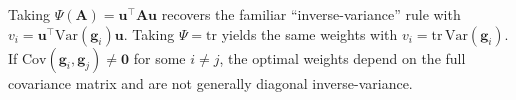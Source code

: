 \begin{remark}
Taking $\Psi(\boldsymbol{A})=\boldsymbol{u}^\top\boldsymbol{A}\boldsymbol{u}$ recovers the familiar “inverse-variance” rule with $v_i=\boldsymbol{u}^\top\mathrm{Var}(\boldsymbol{g}_i)\boldsymbol{u}$. Taking $\Psi=\mathrm{tr}$ yields the same weights with $v_i=\mathrm{tr}\,\mathrm{Var}(\boldsymbol{g}_i)$. If $\mathrm{Cov}(\boldsymbol{g}_i,\boldsymbol{g}_j)\neq \boldsymbol{0}$ for some $i\neq j$, the optimal weights depend on the full covariance matrix and are not generally diagonal inverse-variance.
\end{remark}





